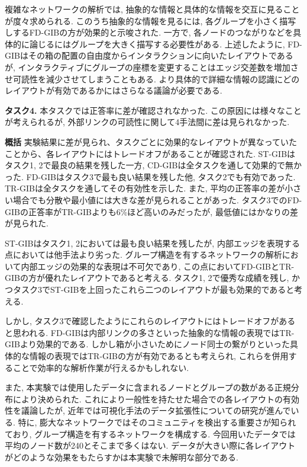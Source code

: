 \documentclass{kuee}
\begin{document}
複雑なネットワークの解析では, 抽象的な情報と具体的な情報を交互に見ることが度々求められる.
このうち抽象的な情報を見るには, 各グループを小さく描写しするFD-GIBの方が効果的と示唆された.
一方で, 各ノードのつながりなどを具体的に論じるにはグループを大きく描写する必要性がある.
上述したように, FD-GIBはその箱の配置の自由度からインタラクションに向いたレイアウトであるが, インタラクティブにグループの座標を変更することはエッジ交差数を増加させ可読性を減少させてしまうこともある.
より具体的で詳細な情報の認識にどのレイアウトが有効であるかにはさらなる議論が必要である.

{\bf タスク4.} 本タスクでは正答率に差が確認されなかった.
この原因には様々なことが考えられるが, 外部リンクの可読性に関して4手法間に差は見られなかった.

{\bf 概括} 実験結果に差が見られ、タスクごとに効果的なレイアウトが異なっていたことから、各レイアウトにはトレードオフがあることが確認された.
ST-GIBはタスク1, 2で最良の結果を残した一方, CD-GIBは全タスクを通して効果的で無かった.
FD-GIBはタスク3で最も良い結果を残した他, タスク2でも有効であった.
TR-GIBは全タスクを通してその有効性を示した.
また, 平均の正答率の差が小さい場合でも分散や最小値には大きな差が見られることがあった.
タスク3でのFD-GIBの正答率がTR-GIBよりも6\%ほど高いのみだったが, 最低値にはかなりの差が見られた.

ST-GIBはタスク1, 2においては最も良い結果を残したが, 内部エッジを表現する点においては他手法より劣った.
グループ構造を有するネットワークの解析において内部エッジの効果的な表現は不可欠であり, この点においてFD-GIBとTR-GIBの方が優れたレイアウトであると考える.
タスク1, 2で優秀な成績を残し, かつタスク3でST-GIBを上回ったこれら二つのレイアウトが最も効果的であると考える.

しかし, タスク3で確認したようにこれらのレイアウトにはトレードオフがあると思われる.
FD-GIBは内部リンクの多さといった抽象的な情報の表現ではTR-GIBより効果的である.
しかし箱が小さいためにノード同士の繋がりといった具体的な情報の表現ではTR-GIBの方が有効であるとも考えられ, これらを併用することで効率的な解析作業が行えるかもしれない.

また, 本実験では使用したデータに含まれるノードとグループの数がある正規分布により決められた.
これにより一般性を持たせた場合での各レイアウトの有効性を議論したが, 近年では可視化手法のデータ拡張性についての研究が進んでいる.
特に, 膨大なネットワークではそのコミュニティを検出する重要さが知られており, グループ構造を有するネットワークを構成する.
今回用いたデータでは平均のノード数が240とそこまで多くはない.
データが大きい際に各レイアウトがどのような効果をもたらすかは本実験で未解明な部分である.
\end{document}
